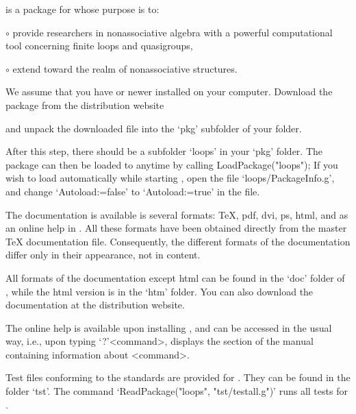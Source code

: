 
{\LOOPS} is a package for  whose purpose is to:
\beginlist%
\item{$\circ$}
    provide researchers in nonassociative algebra with a powerful computational tool
    concerning finite loops and quasigroups,
\item{$\circ$}
    extend {\GAP} toward the realm of nonassociative structures.
\endlist


We assume that you have  or newer installed on your computer.
Download the {\LOOPS} package from the distribution website


and unpack the downloaded file into the `pkg' subfolder of your {\GAP} folder.

After this step, there should be a subfolder `loops' in your `pkg' folder. The
package {\LOOPS} can then be loaded to {\GAP} anytime by calling
\begintt
LoadPackage("loops");
\endtt
If you wish to load {\LOOPS} automatically while starting {\GAP}, open the file
`loops/PackageInfo.g', and change `Autoload:=false' to
`Autoload:=true' in the file.


The documentation is available is several formats: \TeX, pdf, dvi, ps, html,
and as an online help in {\GAP}. All these formats have been obtained directly
from the master {\TeX} documentation file. Consequently, the different formats
of the documentation differ only in their appearance, not in content.

All formats of the documentation except html can be found in the `doc' folder
of {\LOOPS}, while the html version is in the `htm' folder. You can also
download the documentation at the {\LOOPS} distribution website.

The online {\GAP} help is available upon installing {\LOOPS}, and can be
accessed in the usual way, i.e., upon typing `?'<command>, {\GAP} displays the
section of the {\LOOPS} manual containing information about <command>.


Test files conforming to the {\GAP} standards are provided for {\LOOPS}. They
can be found in the folder `tst'. The command `ReadPackage("loops",
"tst/testall.g")' runs all tests for {\LOOPS}.

